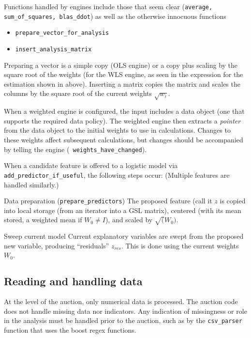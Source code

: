 \documentclass[12pt]{article}
\begin{document}
 Functions handled by engines include those that seem clear ({\tt average,
 sum\_of\_squares, blas\_ddot}) as well as the otherwise innocuous functions
\begin{itemize}
  \item {\tt prepare\_vector\_for\_analysis}
  \item {\tt insert\_analysis\_matrix}
\end{itemize}
 Preparing a vector is a simple copy (OLS engine) or a copy plus scaling by the
 square root of the weights (for the WLS engine, as seen in the expression for
 the estimation shown in  above).  Inserting a matrix copies the
 matrix and scales the columns by the square root of the current weights
 $\sqrt{w_i}$.


 When a weighted engine is configured, the input includes a data object (one
 that supports the required data policy).  The weighted engine then extracts a
 {\em pointer} from the data object to the initial weights to use in
 calculations.  Changes to these weights affect subsequent calculations, but
 changes should be accompanied by telling the engine ({\tt
 weights\_have\_changed}).


 When a candidate feature is offered to a logistic model via {\tt
 add\_predictor\_if\_useful}, the following steps occur: (Multiple features are
 handled similarly.)
\begin{description}
 \item{Data preparation} ({\tt prepare\_predictors}) The proposed feature (call
 it $z$ is copied into local storage (from an iterator into a GSL matrix),
 centered (with its mean stored, a weighted mean if $W_0 \ne I$), and scaled by
 $\sqrt(W_0)$.
 \item{Sweep current model} Current explanatory variables are swept from the
 proposed new variable, producing ``residuals'' $z_{res}$.  This is done using
 the current weights $W_0$.
\end{description}

\subsection{Reading and handling data}

 At the level of the auction, only numerical data is processed.  The auction
 code does not handle missing data nor indicators.  Any indication of
 missingness or role in the analysis must be handled prior to the auction, such
 as by the {\tt csv\_parser} function that uses the boost regex functions.
\end{document}
